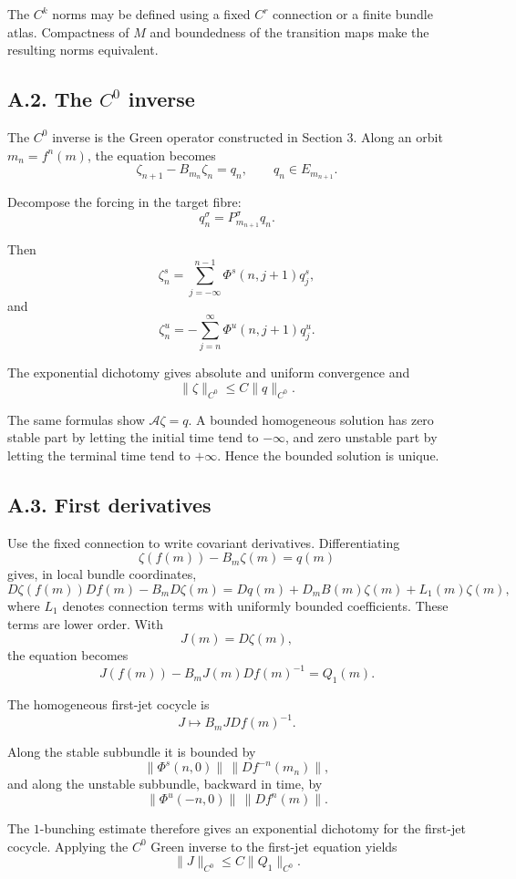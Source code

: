 \documentclass[12pt,a4paper]{article}
\theoremstyle{plain}
\numberwithin{equation}{section}
\numberwithin{theorem}{section}
\begin{document}
The $C^k$ norms may be defined using a fixed $C^r$ connection or a finite bundle atlas. Compactness of $M$ and boundedness of the transition maps make the resulting norms equivalent.

\subsection{A.2. The $C^0$ inverse}

The $C^0$ inverse is the Green operator constructed in Section 3. Along an orbit $m_n=f^n(m)$, the equation becomes
\[
\zeta_{n+1}-B_{m_n}\zeta_n=q_n,
\qquad q_n\in E_{m_{n+1}}.
\]

Decompose the forcing in the target fibre:
\[
q_n^\sigma=P_{m_{n+1}}^\sigma q_n.
\]

Then
\[
\zeta_n^s
=
\sum_{j=-\infty}^{n-1}
\Phi^s(n,j+1)q_j^s,
\]
and
\[
\zeta_n^u
=
-
\sum_{j=n}^{\infty}
\Phi^u(n,j+1)q_j^u.
\]

The exponential dichotomy gives absolute and uniform convergence and
\[
\|\zeta\|_{C^0}\le C\|q\|_{C^0}.
\]

The same formulas show $\mathcal A\zeta=q$. A bounded homogeneous solution has zero stable part by letting the initial time tend to $-\infty$, and zero unstable part by letting the terminal time tend to $+\infty$. Hence the bounded solution is unique.

\subsection{A.3. First derivatives}

Use the fixed connection to write covariant derivatives. Differentiating
\[
\zeta(f(m))-B_m\zeta(m)=q(m)
\]
gives, in local bundle coordinates,
\[
D\zeta(f(m))Df(m)-B_mD\zeta(m)=Dq(m)+D_mB(m)\zeta(m)+L_1(m)\zeta(m),
\]
where $L_1$ denotes connection terms with uniformly bounded coefficients. These terms are lower order. With
\[
J(m)=D\zeta(m),
\]
the equation becomes
\[
J(f(m))-B_mJ(m)Df(m)^{-1}=Q_1(m).
\]

The homogeneous first-jet cocycle is
\[
J\mapsto B_mJDf(m)^{-1}.
\]

Along the stable subbundle it is bounded by
\[
\|\Phi^s(n,0)\|\,\|Df^{-n}(m_n)\|,
\]
and along the unstable subbundle, backward in time, by
\[
\|\Phi^u(-n,0)\|\,\|Df^n(m)\|.
\]

The $1$-bunching estimate therefore gives an exponential dichotomy for the first-jet cocycle. Applying the $C^0$ Green inverse to the first-jet equation yields
\[
\|J\|_{C^0}
\le
C\|Q_1\|_{C^0}.
\]
\end{document}
